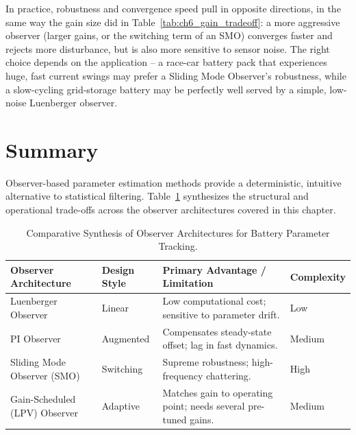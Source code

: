 In practice, robustness and convergence speed pull in opposite directions, in the same way the gain size did in Table~\ref{tab:ch6_gain_tradeoff}: a more aggressive observer (larger gains, or the switching term of an SMO) converges faster and rejects more disturbance, but is also more sensitive to sensor noise. The right choice depends on the application -- a race-car battery pack that experiences huge, fast current swings may prefer a Sliding Mode Observer's robustness, while a slow-cycling grid-storage battery may be perfectly well served by a simple, low-noise Luenberger observer.

\section{Summary}
\label{sec:ch6_summary}

Observer-based parameter estimation methods provide a deterministic, intuitive alternative to statistical filtering. Table~\ref{tab:ch6_observer_comparison} synthesizes the structural and operational trade-offs across the observer architectures covered in this chapter.

\begin{table}[h!]
\centering
\caption{Comparative Synthesis of Observer Architectures for Battery Parameter Tracking.}
\label{tab:ch6_observer_comparison}
\renewcommand{\arraystretch}{1.3}
\footnotesize
\begin{tabularx}{\textwidth}{|p{2.4cm}|p{1.5cm}|X|p{1.4cm}|}
\hline
\textbf{Observer Architecture} & \textbf{Design Style} & \textbf{Primary Advantage / Limitation} & \textbf{Complexity} \\
\hline
Luenberger Observer & Linear & Low computational cost; sensitive to parameter drift. & Low \\
\hline
PI Observer & Augmented & Compensates steady-state offset; lag in fast dynamics. & Medium \\
\hline
Sliding Mode Observer (SMO) & Switching & Supreme robustness; high-frequency chattering. & High \\
\hline
Gain-Scheduled (LPV) Observer & Adaptive & Matches gain to operating point; needs several pre-tuned gains. & Medium \\
\hline
\end{tabularx}
\end{table}

